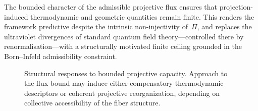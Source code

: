     The bounded character of the admissible projective flux ensures that
    projection-induced thermodynamic and geometric quantities remain finite.
    This renders the framework predictive despite the intrinsic non-injectivity of~$\Pi$,
    and replaces the ultraviolet divergences of standard quantum field theory---controlled
    there by renormalisation---with a structurally motivated finite ceiling grounded in
    the Born--Infeld admissibility constraint.

    \begin{figure}[t]
      \centering
      \caption{Structural responses to bounded projective capacity.
      Approach to the flux bound may induce either compensatory
      thermodynamic descriptors or coherent projective reorganization,
        depending on collective accessibility of the fiber structure.}
      \label{fig:projective-hourglass}
    \end{figure}
